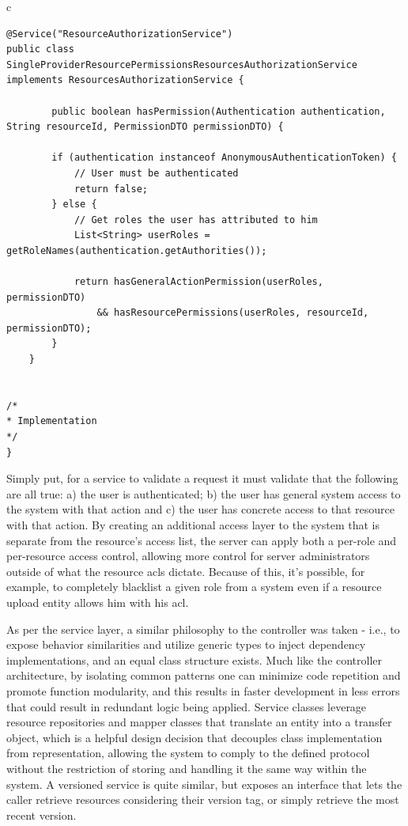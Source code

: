 \begin{center}
\begin{tabular}{c}
\begin{lstlisting}[frame=tlrb, caption=Excerpt of the resource authorization service, label={lst:authorization-service}, basicstyle=\tiny]
@Service("ResourceAuthorizationService")
public class SingleProviderResourcePermissionsResourcesAuthorizationService implements ResourcesAuthorizationService {

        public boolean hasPermission(Authentication authentication, String resourceId, PermissionDTO permissionDTO) {

        if (authentication instanceof AnonymousAuthenticationToken) {
            // User must be authenticated
            return false;
        } else {
            // Get roles the user has attributed to him
            List<String> userRoles = getRoleNames(authentication.getAuthorities());

            return hasGeneralActionPermission(userRoles, permissionDTO)
                && hasResourcePermissions(userRoles, resourceId, permissionDTO);
        }
    }


/*
* Implementation
*/
}
\end{lstlisting}
\end{tabular}
\end{center}


    Simply put, for a service to validate a request it must validate that the following are all true: a) the user is authenticated; b) the user has general system access to the system with that action and c) the user has concrete access to that resource with that action.
    By creating an additional access layer to the system that is separate from the resource's access list, the server can apply both a per-role and per-resource access control, allowing more control for server administrators outside of what the resource \gls{acls} dictate.
    Because of this, it's possible, for example, to completely blacklist a given role from a system even if a resource upload entity allows him with his \gls{acl}.

    As per the service layer, a similar philosophy to the controller was taken - i.e., to expose behavior similarities and utilize generic types to inject dependency implementations, and an equal class structure exists.  
    Much like the controller architecture, by isolating common patterns one can minimize code repetition and promote function modularity, and this results in faster development in less errors that could result in redundant logic being applied.
    Service classes leverage resource repositories and mapper classes that translate an entity into a transfer object, which is a helpful design decision that decouples class implementation from representation, allowing the system to comply to the defined protocol without the restriction of storing and handling it the same way within the system.
    A versioned service is quite similar, but exposes an interface that lets the caller retrieve resources considering their version tag, or simply retrieve the most recent version.

